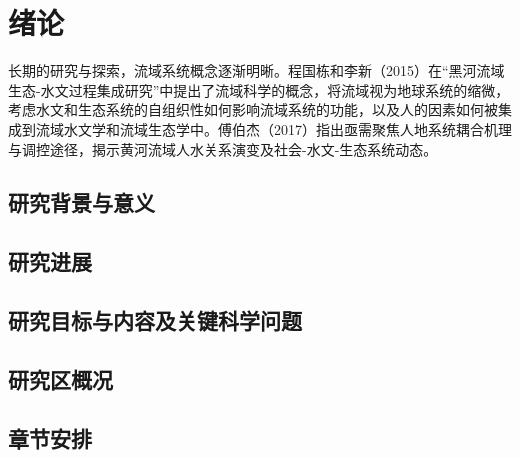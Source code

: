\chapter{绪论}\label{cha:introduction}


长期的研究与探索，流域系统概念逐渐明晰。程国栋和李新（2015）在“黑河流域生态-水文过程集成研究”中提出了流域科学的概念，将流域视为地球系统的缩微，考虑水文和生态系统的自组织性如何影响流域系统的功能，以及人的因素如何被集成到流域水文学和流域生态学中。傅伯杰（2017）指出亟需聚焦人地系统耦合机理与调控途径，揭示黄河流域人水关系演变及社会-水文-生态系统动态。

\section{研究背景与意义}\label{sec:background}


\section{研究进展}\label{sec:introduction}


\section{研究目标与内容及关键科学问题}\label{sec:contents}


\section{研究区概况}\label{sec:study_area}



\section{章节安排}\label{sec:chapters_summary}

